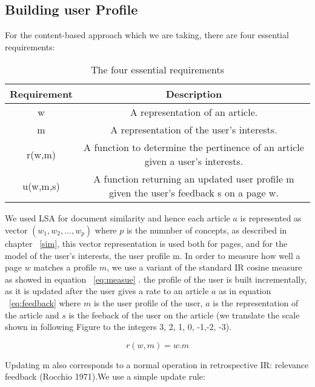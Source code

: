 \subsection{Building user Profile}
For the content-based approach which we are taking, there are four essential requirements:
\begin{table}[ht]
\caption{The four essential requirements} %
\centering  %
\begin{tabular}{c c} %
\hline\hline                        %
Requirement & Description\\ [0.5ex] %
\hline                  %
w & A representation of an article. \\ %
m & A representation of the user's interests.\\
r(w,m)& A function to determine the pertinence of an article given a user's interests.\\
u(w,m,s)& A function returning an updated user profile m given the user's feedback s on a page w. \\[1ex]      %
\hline %
\end{tabular}
\label{table:2} %
\end{table}

We used LSA for document similarity and hence each article $a$ is represented as vector $(w_1, w_2, ...,w_p)$ where $p$ is the numnber of concepts, as described in chapter ~\ref{sim}, this vector representation is used both for pages, and for the model of the user's interests,
the user profile m. In order to measure how well a page $w$ matches a profile $m$, we use a variant of the standard IR cosine measure as showed in equation ~\ref{eq:measue} \citep{recom_1003}. 
the profile of the user is built incrementally, as it is updated after the user gives a rate to an article $a$ as in equation ~\ref{eq:feedback} where $m$ is the user profile of the user, $a$ is the representation of the article and $s$ is the feeback of the user on the article (we translate the scale shown in following Figure to the integers 3, 2, 1, 0, -1,-2, -3).

\begin{equation}
r(w,m)= w.m
\label{eq:measue}
\end{equation}

Updating m also corresponds to a normal operation in retrospective IR: relevance feedback (Rocchio 1971).We use a simple update rule:


